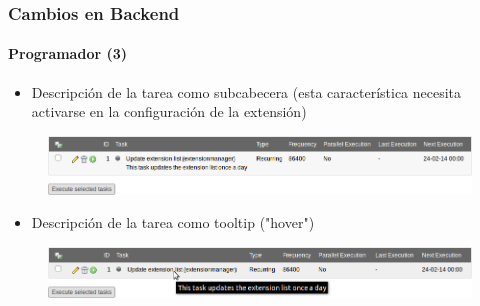 
\begin{frame}[fragile]
	\frametitle{Cambios en Backend}
	\framesubtitle{Programador (3)}

	\begin{itemize}
		\item Descripción de la tarea como subcabecera\newline
			\small(esta característica necesita activarse en la configuración de la extensión)\normalsize
	\end{itemize}

	\begin{figure}
		\includegraphics[width=0.95\linewidth]{Images/BackendChanges/SchedulerTaskDescriptionAsSubheader.png}
	\end{figure}

	\begin{itemize}
		\item Descripción de la tarea como tooltip ("hover")
	\end{itemize}

	\begin{figure}
		\includegraphics[width=0.95\linewidth]{Images/BackendChanges/SchedulerTaskDescriptionAsTooltip.png}
	\end{figure}

\end{frame}


